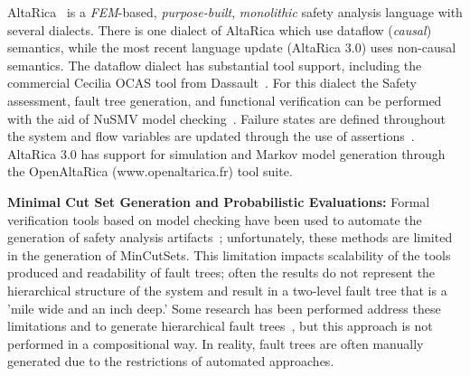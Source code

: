 AltaRica~\cite{PROSVIRNOVA2013127,BieberERTS2018} is a {\em FEM}-based, {\em purpose-built}, {\em monolithic} safety analysis language with several dialects.  There is one dialect of AltaRica which use dataflow ({\em causal}) semantics, while the most recent language update (AltaRica 3.0) uses non-causal semantics.  The dataflow dialect has substantial tool support, including the commercial Cecilia OCAS tool from Dassault~\cite{bieber2004safety}.  For this dialect the Safety assessment, fault tree generation, and functional verification can be performed with the aid of NuSMV model checking~\cite{symbAltaRica}. Failure states are defined throughout the system and flow variables are updated through the use of assertions~\cite{Bieber04safetyassessment}.  AltaRica 3.0 has support for simulation and Markov model generation through the OpenAltaRica (www.openaltarica.fr) tool suite.

\textbf{Minimal Cut Set Generation and Probabilistic Evaluations:}
Formal verification tools based on model checking have been used to automate the generation of safety analysis artifacts~\cite{bieber2002combination,schafer2003combining,bozzano2007symbolic,bozzano2003improving,volk2017fast,Joshi05:SafeComp,CAV2015:BoCiGrMa}; unfortunately, these methods are limited in the generation of MinCutSets. This limitation impacts scalability of the tools produced and readability of fault trees; often the results do not represent the hierarchical structure of the system and result in a two-level fault tree that is a 'mile wide and an inch deep.' Some research has been performed address these limitations and to generate hierarchical fault trees~\cite{CAV2015:BoCiGrMa, 10.1007/978-3-319-11936-6-7}, but this approach is not performed in a compositional way. In reality, fault trees are often manually generated due to the restrictions of automated approaches. 

